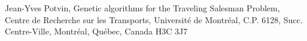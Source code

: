 \documentclass[letterpaper, 10 pt, conference]{ieeeconf}  %
\begin{document}
\begin{figure}[ht!]
\begin{center}
{        }%
%
    \end{center}
   \label{fig:subfigures}
\end{figure}



\clearpage 
\begin{thebibliography}{99}
 Jean-Yves Potvin, Genetic algorithms for the
Traveling Salesman Problem,
Centre de Recherche sur les Transports, Université de Montréal,
C.P. 6128, Succ. Centre-Ville, Montréal, Québec, Canada H3C 3J7 
\end{thebibliography}
\end{document}
